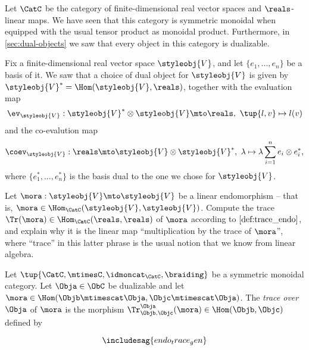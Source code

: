 \begin{gradedexercise}\label{ex:LinearAlgebraTrace}
Let $\CatC$ be the category of finite-dimensional real vector spaces and $\reals$-linear maps. We have seen that this category is symmetric monoidal when equipped with the usual tensor product as monoidal product. Furthermore, in \cref{sec:dual-objects} we saw that every object in this category is dualizable. 

Fix a finite-dimensional real vector space $\styleobj{V}$, and let $\{e_1,...,e_n \}$ be a basis of it. We saw that a choice of dual object for $\styleobj{V}$ is given by $\styleobj{V}^* = \Hom(\styleobj{V}, \reals)$, together with the evaluation map
$$
\ev_\styleobj{V}  : \styleobj{V}^* \otimes \styleobj{V}  \mto \reals, \ \tup{l, v} \mapsto l(v)
$$
and the co-evalution map
$$
\coev_\styleobj{V}  : \reals \mto \styleobj{V}  \otimes \styleobj{V}^*, \ \lambda \mapsto \lambda \sum_{i=1}^n e_i \otimes e_i^*,
$$
where $\{e_1^*,...,e_n^* \}$ is the basis dual to the one we chose for $\styleobj{V}$. 

Let $\mora: \styleobj{V} \mto \styleobj{V}$ be a linear endomorphism -- that is, $\mora \in \Hom_\CatC(\styleobj{V}, \styleobj{V})$. Compute the trace $\Tr(\mora) \in \Hom_\CatC(\reals, \reals)$ of $\mora$ according to $\cref{def:trace_endo}$, and explain why it is the linear map ``multiplication by the trace of $\mora$'', where ``trace'' in this latter phrase is the usual notion that we know from linear algebra. 
\end{gradedexercise}



\begin{ctdefinition}
  \label{def:trace_gen_endo}
Let $\tup{\CatC,\mtimesC,\idmoncat_{\CatC}, \braiding}$ be a symmetric monoidal category. Let $\Obja \in \ObC$ be dualizable and let $\mora \in \Hom(\Objb \mtimescat \Obja, \Objc \mtimescat \Obja)$. The \emph{trace over} $\Obja$ of $\mora$ is the morphism $\Tr_{\Objb, \Objc}^\Obja (\mora) \in \Hom(\Objb, \Objc)$ defined by

  \begin{equation}
\includesag{endo_trace_gen}
\end{equation}
\end{ctdefinition}


